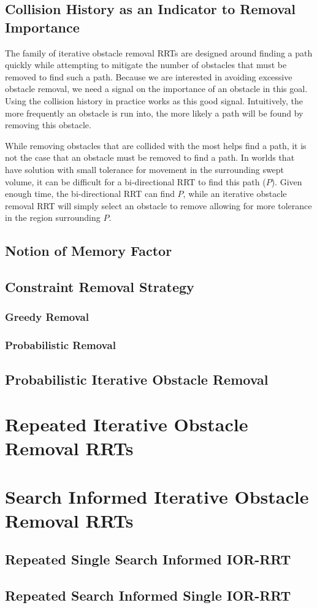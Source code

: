 \subsection{Collision History as an Indicator to Removal Importance}
The family of iterative obstacle removal RRTs are designed around finding a path quickly while attempting to mitigate the number of obstacles that must be removed to find such a path. Because we are interested in avoiding excessive obstacle removal, we need a signal on the importance of an obstacle in this goal. Using the collision history in practice works as this good signal. Intuitively, the more frequently an obstacle is run into, the more likely a path will be found by removing this obstacle.

While removing obstacles that are collided with the most helps find a path, it is not the case that an obstacle must be removed to find a path. In worlds that have solution with small tolerance for movement in the surrounding swept volume, it can be difficult for a bi-directional RRT to find this path ($P$). Given enough time, the bi-directional RRT can find $P$, while an iterative obstacle removal RRT will simply select an obstacle to remove allowing for more tolerance in the region surrounding $P$.

\subsection{Notion of Memory Factor}

\subsection{Constraint Removal Strategy}
\subsubsection{Greedy Removal}
\subsubsection{Probabilistic Removal}

\subsection{Probabilistic Iterative Obstacle Removal}


\section{Repeated Iterative Obstacle Removal RRTs}

\section{Search Informed Iterative Obstacle Removal RRTs}

\subsection{Repeated Single Search Informed IOR-RRT}

\subsection{Repeated Search Informed Single IOR-RRT}





